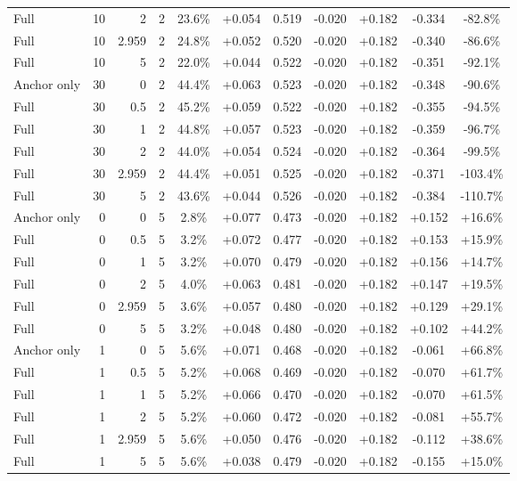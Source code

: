\begin{table}[htbp]
\begin{tabular}{lrrrccccccc}
Full & 10 & 2 & 2 & 23.6\% & +0.054 & 0.519 & -0.020 & +0.182 & -0.334 & -82.8\% \\
Full & 10 & 2.959 & 2 & 24.8\% & +0.052 & 0.520 & -0.020 & +0.182 & -0.340 & -86.6\% \\
Full & 10 & 5 & 2 & 22.0\% & +0.044 & 0.522 & -0.020 & +0.182 & -0.351 & -92.1\% \\
Anchor only & 30 & 0 & 2 & 44.4\% & +0.063 & 0.523 & -0.020 & +0.182 & -0.348 & -90.6\% \\
Full & 30 & 0.5 & 2 & 45.2\% & +0.059 & 0.522 & -0.020 & +0.182 & -0.355 & -94.5\% \\
Full & 30 & 1 & 2 & 44.8\% & +0.057 & 0.523 & -0.020 & +0.182 & -0.359 & -96.7\% \\
Full & 30 & 2 & 2 & 44.0\% & +0.054 & 0.524 & -0.020 & +0.182 & -0.364 & -99.5\% \\
Full & 30 & 2.959 & 2 & 44.4\% & +0.051 & 0.525 & -0.020 & +0.182 & -0.371 & -103.4\% \\
Full & 30 & 5 & 2 & 43.6\% & +0.044 & 0.526 & -0.020 & +0.182 & -0.384 & -110.7\% \\
Anchor only & 0 & 0 & 5 & 2.8\% & +0.077 & 0.473 & -0.020 & +0.182 & +0.152 & +16.6\% \\
Full & 0 & 0.5 & 5 & 3.2\% & +0.072 & 0.477 & -0.020 & +0.182 & +0.153 & +15.9\% \\
Full & 0 & 1 & 5 & 3.2\% & +0.070 & 0.479 & -0.020 & +0.182 & +0.156 & +14.7\% \\
Full & 0 & 2 & 5 & 4.0\% & +0.063 & 0.481 & -0.020 & +0.182 & +0.147 & +19.5\% \\
Full & 0 & 2.959 & 5 & 3.6\% & +0.057 & 0.480 & -0.020 & +0.182 & +0.129 & +29.1\% \\
Full & 0 & 5 & 5 & 3.2\% & +0.048 & 0.480 & -0.020 & +0.182 & +0.102 & +44.2\% \\
Anchor only & 1 & 0 & 5 & 5.6\% & +0.071 & 0.468 & -0.020 & +0.182 & -0.061 & +66.8\% \\
Full & 1 & 0.5 & 5 & 5.2\% & +0.068 & 0.469 & -0.020 & +0.182 & -0.070 & +61.7\% \\
Full & 1 & 1 & 5 & 5.2\% & +0.066 & 0.470 & -0.020 & +0.182 & -0.070 & +61.5\% \\
Full & 1 & 2 & 5 & 5.2\% & +0.060 & 0.472 & -0.020 & +0.182 & -0.081 & +55.7\% \\
Full & 1 & 2.959 & 5 & 5.6\% & +0.050 & 0.476 & -0.020 & +0.182 & -0.112 & +38.6\% \\
Full & 1 & 5 & 5 & 5.6\% & +0.038 & 0.479 & -0.020 & +0.182 & -0.155 & +15.0\% \\

\end{tabular}
\end{table}
